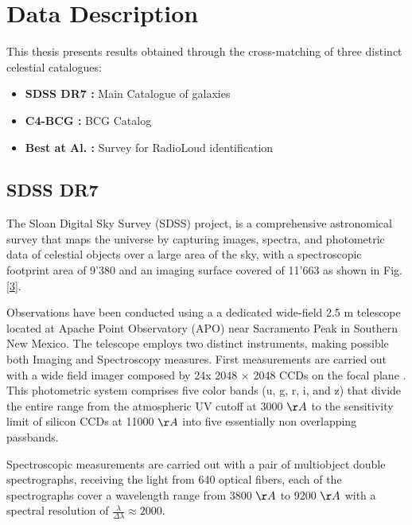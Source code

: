 \section{Data Description}
This thesis presents results obtained through the cross-matching of three distinct celestial catalogues:
\begin{itemize}
	\item\textbf{SDSS DR7 :}  Main Catalogue of galaxies \cite{2009ApJS..182..543A,mpa-sdss-dr7}
	\item \textbf{C4-BCG :}  BCG Catalog \cite{2009yCat..73790867V}
	\item \textbf{Best at Al. :}   Survey for RadioLoud identification \cite{2005MNRAS.362....9B}
\end{itemize}

\subsection{SDSS DR7}
The Sloan Digital Sky Survey (SDSS) project, is a comprehensive astronomical survey that maps the universe by capturing images, spectra, and photometric data of celestial objects over a large area of the sky, with a spectroscopic footprint area of 9'380  and an imaging surface covered of  11'663  \cite{2009ApJS..182..543A} as shown in Fig.\ref{3}.

Observations have been conducted using a a dedicated wide-field 2.5 m telescope \cite{2006AJ....131.2332G} located at Apache Point Observatory (APO) near Sacramento Peak in Southern New Mexico. The telescope employs two distinct instruments, making possible both Imaging and Spectroscopy measures. First measurements are carried out with a wide field imager composed by 24x 2048 × 2048 CCDs on the focal plane \cite{1998AJ....116.3040G}.
This photometric system comprises five color bands (u, g, r, i, and z) that divide the entire range from the atmospheric UV cutoff at 3000 $\AA$ to the sensitivity limit of silicon CCDs at 11000  $\AA$ into five essentially non overlapping passbands.

Spectroscopic measurements are carried out with a pair of multiobject double spectrographs, receiving the light from 640 optical fibers, each of the spectrographs cover a wavelength range from 3800 $\AA$ to 9200 $\AA$ with a spectral resolution of $\frac{\lambda}{\Delta \lambda} \approx 2000$. \cite{2009ApJS..182..543A}
\vspace{0.5cm}

